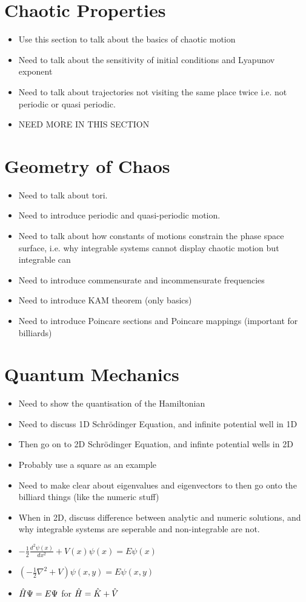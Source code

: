 \documentclass[12pt,a4paper]{amsart}
\begin{document}
\section*{Chaotic Properties}
\begin{itemize}
    \item Use this section to talk about the basics of chaotic motion
    \item Need to talk about the sensitivity of initial conditions and Lyapunov exponent
    \item Need to talk about trajectories not visiting the same place twice i.e. not periodic or quasi periodic.
    \item NEED MORE IN THIS SECTION
\end{itemize}

\section*{Geometry of Chaos}
\begin{itemize}
    \item Need to talk about tori.
    \item Need to introduce periodic and quasi-periodic motion.
    \item Need to talk about how constants of motions constrain the phase space surface, i.e. why integrable systems cannot display chaotic motion but integrable can
    \item Need to introduce commensurate and incommensurate frequencies
    \item Need to introduce KAM theorem (only basics)
    \item Need to introduce Poincare sections and Poincare mappings (important for billiards)
\end{itemize}

\section*{Quantum Mechanics}
\begin{itemize}
    \item Need to show the quantisation of the Hamiltonian
    \item Need to discuss 1D Schrödinger Equation, and infinite potential well in 1D
    \item Then go on to 2D Schrödinger Equation, and infinte potential wells in 2D
    \item Probably use a square as an example
    \item Need to make clear about eigenvalues and eigenvectors to then go onto the billiard things (like the numeric stuff)
    \item When in 2D, discuss difference between analytic and numeric solutions, and why integrable systems are seperable and non-integrable are not.
    \item $-\frac{1}{2} \frac{d^2 \psi(x)}{dx^2} + V(x) \psi(x) = E \psi(x)$
    \item $(-\frac{1}{2} \nabla^{2} + V)\psi(x, y) = E\psi(x, y)$
    \item $\Hat{H}\Psi = E\Psi$ for $\Hat{H} = \Hat{K} + \Hat{V}$
\end{itemize}
\end{document}
